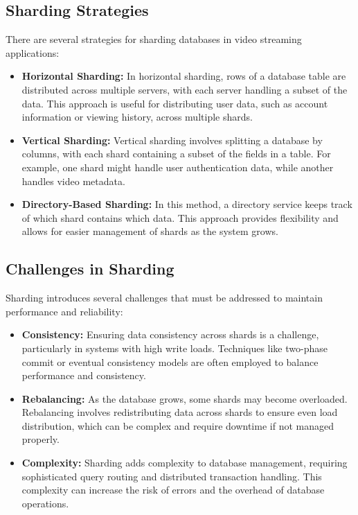 \subsection{Sharding Strategies}
There are several strategies for sharding databases in video streaming applications:

\begin{itemize}
    \item \textbf{Horizontal Sharding:} In horizontal sharding, rows of a database table are distributed across multiple servers, with each server handling a subset of the data. This approach is useful for distributing user data, such as account information or viewing history, across multiple shards\cite{horizontal_sharding}.
    
    \item \textbf{Vertical Sharding:} Vertical sharding involves splitting a database by columns, with each shard containing a subset of the fields in a table. For example, one shard might handle user authentication data, while another handles video metadata\cite{vertical_sharding}.
    
    \item \textbf{Directory-Based Sharding:} In this method, a directory service keeps track of which shard contains which data. This approach provides flexibility and allows for easier management of shards as the system grows\cite{directory_sharding}.
\end{itemize}

\subsection{Challenges in Sharding}
Sharding introduces several challenges that must be addressed to maintain performance and reliability:

\begin{itemize}
    \item \textbf{Consistency:} Ensuring data consistency across shards is a challenge, particularly in systems with high write loads. Techniques like two-phase commit or eventual consistency models are often employed to balance performance and consistency\cite{consistency_sharding}.
    
    \item \textbf{Rebalancing:} As the database grows, some shards may become overloaded. Rebalancing involves redistributing data across shards to ensure even load distribution, which can be complex and require downtime if not managed properly\cite{rebalancing_sharding}.
    
    \item \textbf{Complexity:} Sharding adds complexity to database management, requiring sophisticated query routing and distributed transaction handling. This complexity can increase the risk of errors and the overhead of database operations\cite{complexity_sharding}.
\end{itemize}

